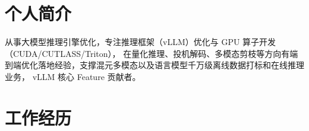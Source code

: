 \documentclass{resume}
\begin{document}



\section{个人简介}
从事大模型推理引擎优化，专注推理框架（vLLM）优化与 GPU 算子开发（CUDA/CUTLASS/Triton），
在量化推理、投机解码、多模态剪枝等方向有端到端优化落地经验，支撑混元多模态以及语言模型千万级离线数据打标和在线推理业务， vLLM 核心 Feature 贡献者。

\section{工作经历}
\end{document}
